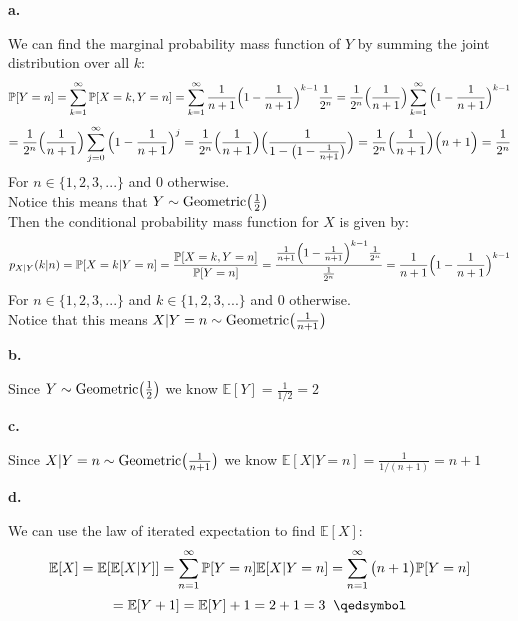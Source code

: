 \documentclass{article}
\begin{document}
{\Large\textbf{a.}}
\begin{center}
\doublespacing
    We can find the marginal probability mass function of $Y$ by summing the joint distribution over all $k$:
    \[\mathbb{P}[Y = n] =\sum_{k = 1}^\infty\mathbb{P}[X = k, Y = n] =\sum_{k = 1}^\infty\frac{1}{n+1}\Big{(}1 -\frac{1}{n+1}\Big{)}^{k-1}\frac{1}{2^n} =\frac{1}{2^n}\Big{(}\frac{1}{n+1}\Big{)}\sum_{k = 1}^\infty\Big{(}1 -\frac{1}{n+1}\Big{)}^{k-1}\]
    \[=\frac{1}{2^n}\Big{(}\frac{1}{n+1}\Big{)}\sum_{j = 0}^\infty\Big{(}1 -\frac{1}{n+1}\Big{)}^{j} =\frac{1}{2^n}\Big{(}\frac{1}{n+1}\Big{)}\Big{(}\frac{1}{1 -\big{(}1 -\frac{1}{n+1}\big{)}}\Big{)} =\frac{1}{2^n}\Big{(}\frac{1}{n+1}\Big{)}\Big{(}n+1\Big{)} =\frac{1}{2^n}\]
    For $n\in\{1, 2, 3, ...\}$ and 0 otherwise.
    \\Notice this means that $Y\sim\mbox{Geometric}\big{(}\frac{1}{2}\big{)}$
    \\Then the conditional probability mass function for $X$ is given by:
    \[p_{X | Y} (k | n) =\mathbb{P}[X = k | Y = n] =\frac{\mathbb{P}[X = k, Y = n]}{\mathbb{P}[Y = n]} =\frac{\frac{1}{n+1}\Big{(}1 -\frac{1}{n+1}\Big{)}^{k-1}\frac{1}{2^n}}{\frac{1}{2^n}} =\frac{1}{n+1}\Big{(}1 -\frac{1}{n+1}\Big{)}^{k - 1}\]
    For $n\in\{1, 2, 3, ...\}$ and $k\in\{1, 2, 3, ...\}$ and 0 otherwise.
    \\Notice that this means $X | Y = n\sim\mbox{Geometric}\big{(}\frac{1}{n+1}\big{)}$
\end{center}

{\Large\textbf{b.}}
\begin{center}
\doublespacing
    Since $Y\sim\mbox{Geometric}\big{(}\frac{1}{2}\big{)}$ we know $\mathbb{E}[Y] =\frac{1}{1/2} = 2$ \qedsymbol
\end{center}

{\Large\textbf{c.}}
\begin{center}
\doublespacing
    Since $X | Y = n\sim\mbox{Geometric}\big{(}\frac{1}{n+1}\big{)}$ we know $\mathbb{E}[X | Y = n] =\frac{1}{1/(n+1)} = n + 1$ \qedsymbol
\end{center}

{\Large\textbf{d.}}
\begin{center}
\doublespacing
    We can use the law of iterated expectation to find $\mathbb{E}[X]$:
    \[\mathbb{E}[X] =\mathbb{E}[\mathbb{E}[X | Y]] =\sum_{n=1}^\infty\mathbb{P}[Y = n]\mathbb{E}[X | Y = n] =\sum_{n=1}^\infty\big{(}n + 1\big{)}\mathbb{P}[Y = n]\]
    \[=\mathbb{E}[Y + 1] =\mathbb{E}[Y] + 1 = 2 + 1 = 3\;\;\qedsymbol\]
\end{center}
\end{document}
